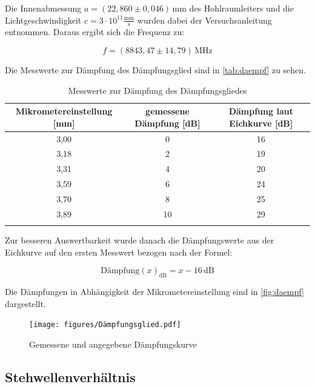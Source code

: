 Die Innenabmessung $a = (22,860 \pm 0,046)\,$mm des Hohlraumleiters und die Lichtgeschwindigkeit $c = 3\cdot 10^{11} \frac{\text{mm}}{\text{s}}$ wurden dabei der Versuchsanleitung entnommen.
Daraus ergibt sich die Frequenz zu:

\begin{equation}
f = (8843,47 \pm 14,79)\,\text{MHz}
\label{eq:freq2}
\end{equation}

Die Messwerte zur Dämpfung des Dämpfungsglied sind in \autoref{tab:daempf} zu sehen.


\begin{table}
\centering
\caption{Messwerte zur Dämpfung des Dämpfungsgliedes}
\begin{tabular}{c c c}
\toprule
{Mikrometereinstellung [mm]} & {gemessene Dämpfung [dB]} & {Dämpfung laut Eichkurve [dB]}\\
\midrule
3,00	&0	&16\\
3,18	&2	&19\\
3,31	&4	&20\\
3,59	&6	&24\\
3,70	&8	&25\\
3,89	&10	&29\\

\bottomrule
\label{tab:daempf}
\end{tabular}
\end{table}

Zur besseren Auswertbarkeit wurde danach die Dämpfungswerte aus der Eichkurve auf den ersten Messwert bezogen nach der Formel:

\begin{equation}
\text{Dämpfung}(x)_{\text{dB}} = x - 16\,\text{dB}
\label{eq:daempf}
\end{equation}

Die Dämpfungen in Abhängigkeit der Mikrometereinstellung sind in \autoref{fig:daempf} dargestellt.



\begin{figure}
\texttt{[image: figures/Dämpfungsglied.pdf]}
\caption{Gemessene und angegebene Dämpfungskurve}
\label{fig:daempf}
\end{figure}










\subsection{Stehwellenverhältnis}
\label{sec:welligkeit}


